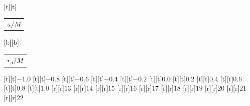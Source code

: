 %    
%
%
\begin{psfrags}%
\psfragscanon%
%
[t][t]{\color[rgb]{0,0,0}\setlength{\tabcolsep}{0pt}\begin{tabular}{c}{\Large $a/M$}\end{tabular}}%
[b][b]{\color[rgb]{0,0,0}\setlength{\tabcolsep}{0pt}\begin{tabular}{c}{\Large $r_\mathrm{p}/M$}\end{tabular}}%
%
[t][t]{$-1.0$}%
[t][t]{$-0.8$}%
[t][t]{$-0.6$}%
[t][t]{$-0.4$}%
[t][t]{$-0.2$}%
[t][t]{$0.0$}%
[t][t]{$0.2$}%
[t][t]{$0.4$}%
[t][t]{$0.6$}%
[t][t]{$0.8$}%
[t][t]{$1.0$}%
%
[r][r]{$13$}%
[r][r]{$14$}%
[r][r]{$15$}%
[r][r]{$16$}%
[r][r]{$17$}%
[r][r]{$18$}%
[r][r]{$19$}%
[r][r]{$20$}%
[r][r]{$21$}%
[r][r]{$22$}%
%
%
\end{psfrags}%
%
